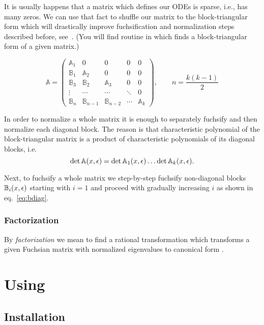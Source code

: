 \documentclass[12pt,a4paper]{article}
\def\M#1{\mathbb{#1}} %
\begin{document}
It is usually happens that a matrix which defines our ODEs is sparse, i.e., has many zeros.
We can use that fact to shuffle our matrix to the block-triangular form which will drastically improve fuchsification and normalization steps described before, see~\cite[Section 7]{Lee15}.
(You will find  routine in \fuchsia which finds a block-triangular form of a given matrix.)

\begin{equation}
\label{eq:bdiag}
\M A = 
\left(
\begin{matrix}
  \M A_1 & 0      & 0 & 0 & 0
\\
  \M B_1 & \M A_2 & 0 & 0 & 0
\\
  \M B_3 & \M B_2 & \M A_3 & 0 & 0
\\
  \vdots & \cdots & \cdots & \ddots & 0
\\
  \M B_n & \M B_{n-1} & \M B_{n-2} & \cdots & \M A_k
\end{matrix}
\right), \qquad n=\frac{k(k-1)}{2}
\end{equation}

In order to normalize a whole matrix it is enough to separately fuchsify and then normalize each diagonal block.
The reason is that characteristic polynomial of the block-triangular matrix is a product of characteristic polynomials of its diagonal blocks, i.e.
\begin{equation}
  \det{\M A(x,\eps)} = \det{\M A_1(x,\eps)} \ldots  \det{\M A_k(x,\eps)}.
\end{equation}

Next, to fuchsify a whole matrix we step-by-step fuchsify non-diagonal blocks $\M B_i(x,\eps)$ starting with $i=1$ and proceed with gradually increasing $i$ as shown in eq.~\eqref{eq:bdiag}.


\subsubsection{Factorization}
By {\em factorization} we mean to find a rational transformation which transforms a given Fuchsian matrix with normalized eigenvalues to canonical form \cite{Henn13}.


\section{Using \fuchsia}
\label{sec:3}

\subsection{Installation}
\end{document}
